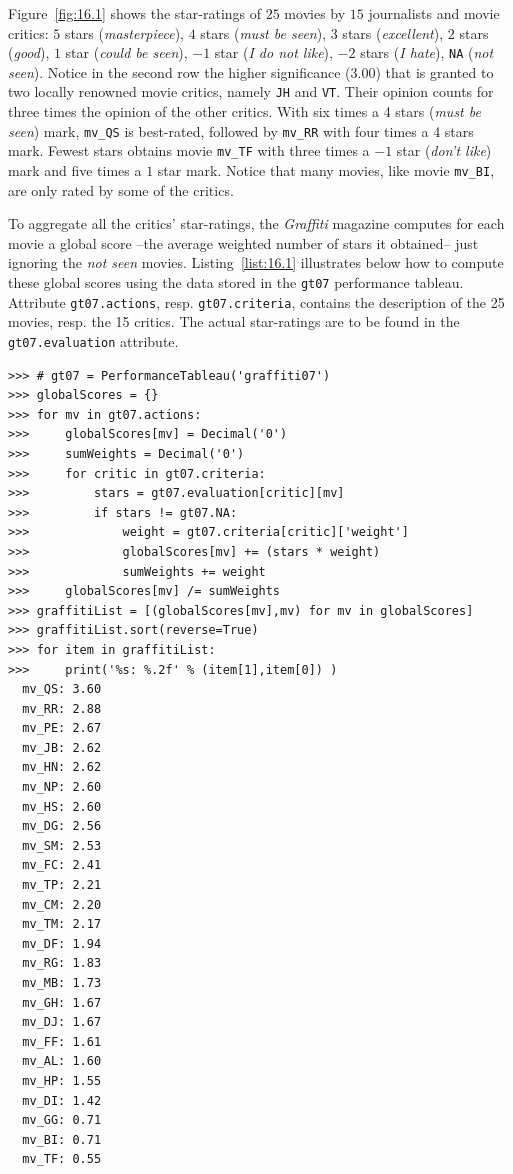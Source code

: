 Figure~\vref{fig:16.1} shows the star-ratings of $25$ movies by $15$ journalists and movie critics: $5$ stars (\emph{masterpiece}), $4$ stars (\emph{must be seen}), $3$ stars (\emph{excellent}), $2$ stars (\emph{good}), $1$ star (\emph{could be seen}), $-1$ star (\emph{I do not like}), $-2$ stars (\emph{I hate}), \texttt{NA} (\emph{not seen}). Notice in the second row the higher significance ($3.00$) that is granted to two locally renowned movie critics, namely \texttt{JH} and \texttt{VT}. Their opinion counts for three times the opinion of the other critics. With six times a 4 stars (\emph{must be seen}) mark, \texttt{mv\_QS} is best-rated, followed by \texttt{mv\_RR} with four times a 4 stars mark. Fewest stars obtains movie \texttt{mv\_TF} with three times a $-1$ star (\emph{don't like}) mark and five times a $1$ star mark. Notice that many movies, like movie \texttt{mv\_BI}, are only rated by some of the critics. 

To aggregate all the critics' star-ratings, the \emph{Graffiti} magazine computes for each movie a global score --the average weighted number of stars it obtained-- just ignoring the \emph{not seen} movies. Listing~\vref{list:16.1} illustrates below how to compute these global scores using the data stored in the \texttt{gt07} performance tableau. Attribute \texttt{gt07.actions}, resp. \texttt{gt07.criteria}, contains the description of the 25 movies, resp. the 15 critics. The actual star-ratings are to be found in the \texttt{gt07.evaluation} attribute.
\begin{lstlisting}[caption={Computing the average weighted number of stars per movie},label=list:16.1,basicstyle=\ttfamily\scriptsize]
>>> # gt07 = PerformanceTableau('graffiti07')
>>> globalScores = {}
>>> for mv in gt07.actions:
>>>     globalScores[mv] = Decimal('0')
>>>     sumWeights = Decimal('0')
>>>     for critic in gt07.criteria:
>>>         stars = gt07.evaluation[critic][mv]
>>>         if stars != gt07.NA:
>>>             weight = gt07.criteria[critic]['weight']
>>>             globalScores[mv] += (stars * weight)
>>>             sumWeights += weight
>>>     globalScores[mv] /= sumWeights
>>> graffitiList = [(globalScores[mv],mv) for mv in globalScores]
>>> graffitiList.sort(reverse=True)
>>> for item in graffitiList:
>>>     print('%s: %.2f' % (item[1],item[0]) )
  mv_QS: 3.60
  mv_RR: 2.88
  mv_PE: 2.67
  mv_JB: 2.62
  mv_HN: 2.62
  mv_NP: 2.60
  mv_HS: 2.60
  mv_DG: 2.56
  mv_SM: 2.53
  mv_FC: 2.41
  mv_TP: 2.21
  mv_CM: 2.20
  mv_TM: 2.17
  mv_DF: 1.94
  mv_RG: 1.83
  mv_MB: 1.73
  mv_GH: 1.67
  mv_DJ: 1.67
  mv_FF: 1.61
  mv_AL: 1.60
  mv_HP: 1.55
  mv_DI: 1.42
  mv_GG: 0.71
  mv_BI: 0.71
  mv_TF: 0.55
\end{lstlisting}

